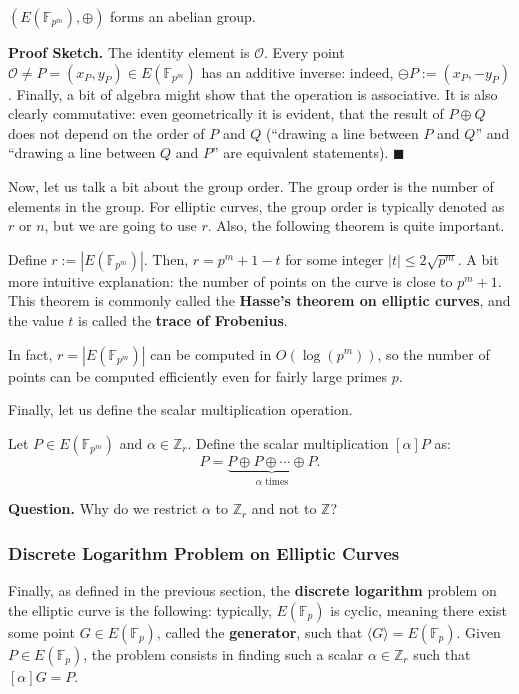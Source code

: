\documentclass[../lecture-notes.tex]{subfiles}
\begin{document}
\begin{theorem}
    $(E(\mathbb{F}_{p^m}),\oplus)$ forms an abelian group.
\end{theorem}

\textbf{Proof Sketch.} The identity element is $\mathcal{O}$. Every point $\mathcal{O} \neq P=(x_P,y_P) \in E(\mathbb{F}_{p^m})$ has an additive inverse: indeed, $\ominus P := (x_P,-y_P)$. Finally, a bit of algebra might show that the operation is associative. It is also clearly commutative: even geometrically it is evident, that the result of $P\oplus Q$ does not depend on the order of $P$ and $Q$ (``drawing a line between $P$ and $Q$'' and ``drawing a line between $Q$ and $P$'' are equivalent statements). $\blacksquare$

Now, let us talk a bit about the group order. The group order is the number of elements in the group. For elliptic curves, the group order is typically denoted as $r$ or $n$, but we are going to use $r$. Also, the following theorem is quite important.

\begin{theorem}
    Define $r := |E(\mathbb{F}_{p^m})|$. Then, $r = p^m + 1 - t$ for some integer $|t| \leq 2\sqrt{p^m}$. A bit more intuitive explanation: the number of points on the curve is close to $p^m+1$. This theorem is commonly called the \textbf{Hasse's theorem on elliptic curves}, and the value $t$ is called the \textbf{trace of Frobenius}.
\end{theorem}

\begin{remark}
    In fact, $r=|E(\mathbb{F}_{p^m})|$ can be computed in $O(\log(p^m))$, so the number of points can be computed efficiently even for fairly large primes $p$.
\end{remark}

Finally, let us define the scalar multiplication operation. 

\begin{definition}
    Let $P \in E(\mathbb{F}_{p^m})$ and $\alpha \in \mathbb{Z}_r$. Define the scalar multiplication $[\alpha]P$ as:
    \begin{equation*}
        [\alpha]P = \underbrace{P \oplus P \oplus \cdots \oplus P}_{\alpha \text{ times}}.
    \end{equation*}
\end{definition}

\textbf{Question.} Why do we restrict $\alpha$ to $\mathbb{Z}_r$ and not to $\mathbb{Z}$?

\subsubsection{Discrete Logarithm Problem on Elliptic Curves}
Finally, as defined in the previous section, the \textbf{discrete logarithm} problem on the elliptic curve is the following: typically, $E(\mathbb{F}_p)$ is cyclic, meaning there exist some point $G \in E(\mathbb{F}_p)$, called the \textbf{generator}, such that $\langle G \rangle = E(\mathbb{F}_p)$. Given $P \in E(\mathbb{F}_p)$, the problem consists in finding such a scalar $\alpha \in \mathbb{Z}_r$ such that $[\alpha]G = P$. 
\end{document}
